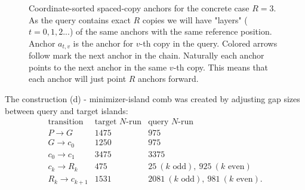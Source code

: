 \begin{figure}[H]
\caption{Coordinate-sorted spaced-copy anchors for the concrete case $R=3$.
As the query contains exact $R$ copies we will have "layers" ($t=0,1,2...$) of the same anchors with the same reference position. Anchor
$a_{t,v}$ is the anchor for $v$-th copy in the query.  Colored arrows follow mark the next anchor in the chain. Naturally each anchor points to the next anchor in the same $v$-th copy. This means that each anchor will just point $R$ anchors forward.}
\label{fig:spaced-copy-anchor-order}
\end{figure}

The construction (d) - minimizer-island comb was created by adjusting gap sizes between query and target islands:
\[
\begin{array}{c|cc}
\text{transition} & \text{target }N\text{-run} & \text{query }N\text{-run}\\
\hline
P\to G & 1475 & 975\\
G\to c_0 & 1250 & 975\\
c_0\to c_1 & 3475 & 3375\\
c_k\to R_k & 475 & 25\ (k\text{ odd}),\ 925\ (k\text{ even})\\
R_k\to c_{k+1} & 1531 & 2081\ (k\text{ odd}),\ 981\ (k\text{ even}).
\end{array}
\]


